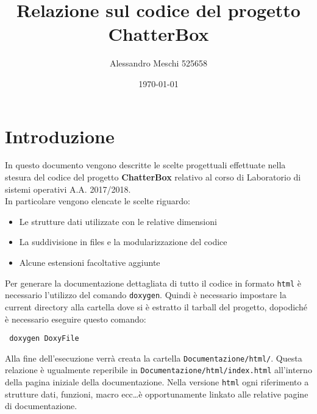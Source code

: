 \documentclass[a4paper,12pt]{report}
\begin{document}
\title{Relazione sul codice del progetto ChatterBox}
\author{Alessandro Meschi 525658}
\date{\today}
\maketitle

\section*{Introduzione}
In questo documento vengono descritte le scelte progettuali effettuate nella stesura del codice
del progetto \textbf{ChatterBox} relativo al corso di Laboratorio di sistemi operativi A.A. 2017/2018.\\
In particolare vengono elencate le scelte riguardo:
\begin{itemize}
\item Le strutture dati utilizzate con le relative dimensioni
\item La suddivisione in files e la modularizzazione del codice
\item Alcune estensioni facoltative aggiunte
\end{itemize}
Per generare la documentazione dettagliata di tutto il codice in formato \texttt{html} è necessario l'utilizzo del comando
\texttt{doxygen}. Quindi è necessario impostare la current directory alla cartella dove si è estratto il tarball del progetto,
dopodiché è necessario eseguire questo comando:
\begin{verbatim} doxygen DoxyFile
\end{verbatim}
Alla fine dell'esecuzione verrà creata la cartella \texttt{Documentazione/html/}.
Questa relazione è ugualmente reperibile in \texttt{Documentazione/html/index.html} all'interno della pagina iniziale della documentazione.
Nella versione \texttt{html} ogni riferimento a strutture dati, funzioni, macro ecc\ldots è opportunamente linkato alle relative pagine
di documentazione.
\end{document}
